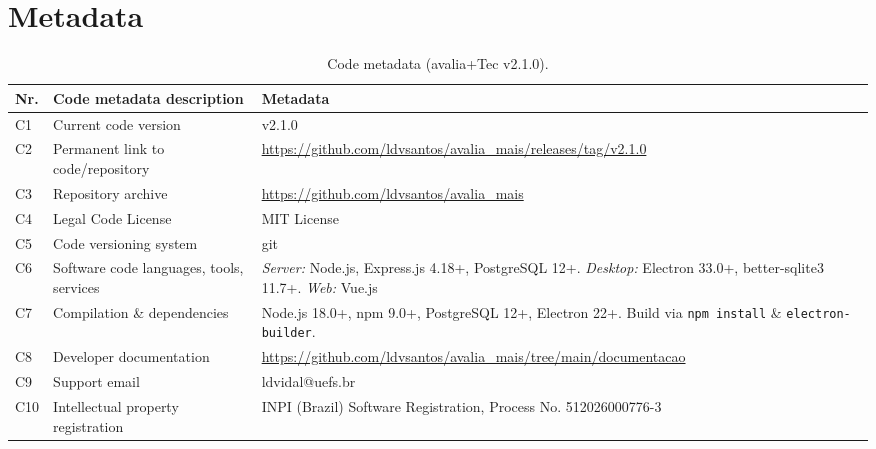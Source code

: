 \documentclass[preprint,12pt,a4paper]{elsarticle}
\begin{document}

\section*{Metadata}

\begin{table}[!h]
\begin{tabular}{|l|p{6.5cm}|p{6.5cm}|}
\hline
\textbf{Nr.} & \textbf{Code metadata description} & \textbf{Metadata} \\
\hline
C1 & Current code version & v2.1.0 \\
\hline
C2 & Permanent link to code/repository & \url{https://github.com/ldvsantos/avalia_mais/releases/tag/v2.1.0} \\
\hline
C3 & Repository archive & \url{https://github.com/ldvsantos/avalia_mais} \\
\hline
C4 & Legal Code License & MIT License \\
\hline
C5 & Code versioning system & git \\
\hline
C6 & Software code languages, tools, services & \textit{Server:} Node.js, Express.js 4.18+, PostgreSQL 12+. \textit{Desktop:} Electron 33.0+, better-sqlite3 11.7+. \textit{Web:} Vue.js \\
\hline
C7 & Compilation \& dependencies & Node.js 18.0+, npm 9.0+, PostgreSQL 12+, Electron 22+. Build via \texttt{npm install} \& \texttt{electron-builder}. \\
\hline
C8 & Developer documentation & \url{https://github.com/ldvsantos/avalia_mais/tree/main/documentacao} \\
\hline
C9 & Support email & ldvidal@uefs.br \\
\hline
C10 & Intellectual property registration & INPI (Brazil) Software Registration, Process No. 512026000776-3 \\
\hline
\end{tabular}
\caption{Code metadata (avalia+Tec v2.1.0).}
\label{codeMetadata}
\end{table}
\end{document}

